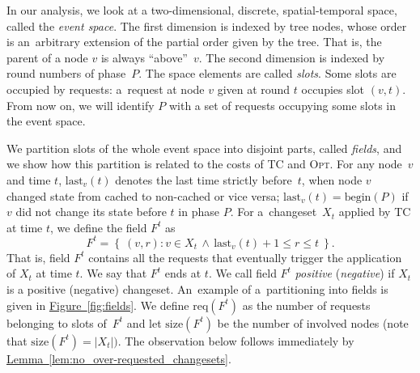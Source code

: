 \documentclass[sigconf,screen=true]{acmart}
\newcommand{\lref}[2][]{\hyperref[#2]{#1~\ref*{#2}}}
\newcommand{\ALG}{\textsc{TC}\xspace}
\newcommand{\OPT}{\textsc{Opt}\xspace}
\newcommand{\last}{\textrm{last}}
\newcommand{\size}{\textrm{size}}
\newcommand{\req}{\textrm{req}}
\newcommand{\beP}{\textrm{begin}(P)}
\begin{document}
In our analysis, we look at a two-dimensional, discrete, spatial-temporal
space, called the \emph{event space}. The first dimension is indexed by tree
nodes, whose order is an~arbitrary extension of the partial order given by the
tree. That is, the parent of a node $v$ is always ``above''~$v$. The second
dimension is indexed by round numbers of phase~$P$. The space elements are
called \emph{slots}. Some slots are occupied by requests: a~request at node
$v$ given at round $t$ occupies slot $(v,t)$. From now on, we will identify
$P$ with a set of requests occupying some slots in the event space.

We partition slots of the whole event space into disjoint parts, called
\emph{fields}, and we show how this partition is related to the costs of \ALG
and \OPT. For any node~$v$ and time $t$, $\last_v(t)$ denotes the last time
strictly before~$t$, when node $v$ changed state from cached to non-cached or
vice versa; $\last_v(t) = \beP$ if $v$ did not change its state before $t$ in
phase $P$. For a~changeset~$X_t$ applied by
\ALG at time $t$, we define the field $F^t$ as
\[
  F^t = \left\{\ (v,r) : v \in X_t \, \wedge\, \last_v(t)+1 \leq r \leq t\ \right\}.
\]
That is, field $F^t$ contains all the requests that eventually trigger the
application of $X_t$ at time $t$. We say that $F^t$ ends at $t$. We call field
$F^t$ \emph{positive} (\emph{negative}) if $X_t$ is a positive (negative)
changeset. An~example of a~partitioning into fields is given in
\lref[Figure]{fig:fields}. We define $\req(F^t)$ as the number of requests
belonging to slots of~$F^t$ and let $\size(F^t)$ be the number of involved
nodes (note that $\size(F^t) = |X_t|)$. The observation below follows
immediately by \lref[Lemma]{lem:no_over-requested_changesets}.
\end{document}
